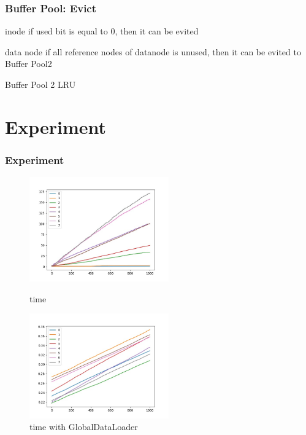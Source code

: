 \documentclass[notheorems, aspectratio=54]{beamer}
\begin{document}
\begin{frame}
    \frametitle{Buffer Pool: Evict}
    \begin{block} {inode}
        if used bit is equal to 0, then it can be evited
    \end{block}
    \begin{block} {data node}
        if all reference nodes of datanode is unused, then it can be evited to Buffer Pool2
    \end{block}
    \begin{block} {Buffer Pool 2}
        LRU
    \end{block}
\end{frame}

\section{Experiment}
\begin{frame}
    \frametitle{Experiment}
    \begin{figure}[htbp]
        \centering
        \begin{minipage}[t]{0.48\textwidth}
        \centering
        \includegraphics[width=6cm]{global_img_dir/l.jpg}
        \caption{time}
        \end{minipage}
        \begin{minipage}[t]{0.48\textwidth}
        \centering
        \includegraphics[width=6cm]{global_img_dir/gl.jpg}
        \caption{time with GlobalDataLoader}
        \end{minipage}
    \end{figure}
\end{frame}
\end{document}
